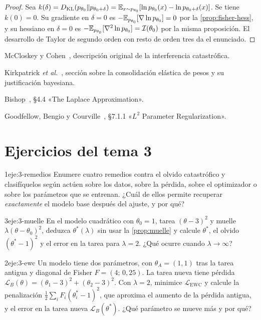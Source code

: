 \begin{proof}
Sea $k(\delta)=D_{\mathrm{KL}}(p_{\theta_0}\|p_{\theta_0+\delta})=\mathbb{E}_{x\sim p_{\theta_0}}[\ln p_{\theta_0}(x)-\ln p_{\theta_0+\delta}(x)]$. Se tiene $k(0)=0$. Su gradiente en $\delta=0$ es $-\mathbb{E}_{p_{\theta_0}}[\nabla\ln p_{\theta_0}]=0$ por la \cref{prop:fisher-hess}, y su hessiano en $\delta=0$ es $-\mathbb{E}_{p_{\theta_0}}[\nabla^{2}\ln p_{\theta_0}]=\mathcal{I}(\theta_0)$ por la misma proposición. El desarrollo de Taylor de segundo orden con resto de orden tres da el enunciado.
\end{proof}

\begin{lecturas}
\item McCloskey y Cohen~\cite{mccloskey}, descripción original de la interferencia catastrófica.
\item Kirkpatrick \emph{et al.}~\cite{kirkpatrick}, sección sobre la consolidación elástica de pesos y su justificación bayesiana.
\item Bishop~\cite{bishop}, §4.4 «The Laplace Approximation».
\item Goodfellow, Bengio y Courville~\cite{gbc}, §7.1.1 «$L^2$ Parameter Regularization».
\end{lecturas}

\section*{Ejercicios del tema 3}

\begin{ejercicio}{1}{eje:3-remedios}
Enumere cuatro remedios contra el olvido catastrófico y clasifíquelos según actúen sobre los datos, sobre la pérdida, sobre el optimizador o sobre los parámetros que se entrenan. ¿Cuál de ellos permite recuperar \emph{exactamente} el modelo base después del ajuste, y por qué?
\end{ejercicio}

\begin{ejercicio}{3}{eje:3-muelle}
En el modelo cuadrático con $\theta_0=1$, tarea $(\theta-3)^{2}$ y muelle $\lambda(\theta-\theta_0)^{2}$, deduzca $\theta^{\ast}(\lambda)$ sin usar la \cref{prop:muelle} y calcule $\theta^{\ast}$, el olvido $(\theta^{\ast}-1)^{2}$ y el error en la tarea para $\lambda=2$. ¿Qué ocurre cuando $\lambda\to\infty$?
\end{ejercicio}

\begin{ejercicio}{2}{eje:3-ewc}
Un modelo tiene dos parámetros, con $\theta_A=(1,1)$ tras la tarea antigua y diagonal de Fisher $F=(4;\,0{,}25)$. La tarea nueva tiene pérdida $\mathcal{L}_B(\theta)=(\theta_1-3)^{2}+(\theta_2-3)^{2}$. Con $\lambda=2$, minimice $\mathcal{L}_{\mathrm{EWC}}$ y calcule la penalización $\frac12\sum_iF_i(\theta^{\ast}_i-1)^{2}$, que aproxima el aumento de la pérdida antigua, y el error en la tarea nueva $\mathcal{L}_B(\theta^{\ast})$. ¿Qué parámetro se mueve más y por qué?
\end{ejercicio}

